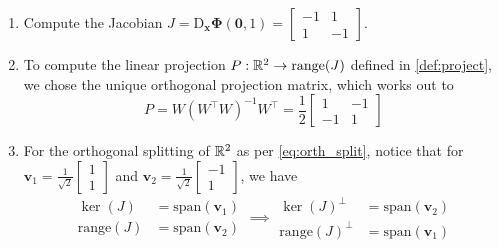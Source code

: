 \documentclass[letterpaper, 10 pt, conference, dvipsnames]{ieeeconf}
\begin{document}
\begin{enumerate}
    \itemsep 0.5em
    \item Compute the Jacobian \(J = \mathrm{D}_\mathbf{x}\boldsymbol{\Phi}(\mathbf{0},1) = \begin{bmatrix}-1&1\\1&-1\end{bmatrix}\).
    \item To compute the linear projection \(P:\R[2]\to\mathrm{range}(J)\) defined in \eqref{def:project}, {we chose the unique orthogonal projection matrix}, which works out to
          \begin{equation*}
              P = {W(W^\top W)^{-1}W^\top} = \frac12\begin{bmatrix}1&-1\\-1&1\end{bmatrix}\label{eq:P}
          \end{equation*}
    \item For the orthogonal splitting of \(\R[2]\) as per \eqref{eq:orth_split}, notice that for \(\mathbf{v}_1 = \displaystyle\frac{1}{\sqrt2}\begin{bmatrix}1\\1\end{bmatrix}\) and \(\mathbf{v}_2 = \displaystyle\frac{1}{\sqrt2}\begin{bmatrix}-1\\1\end{bmatrix}\), we have \label{eq:basis}
          \[\begin{aligned}
                  \ker(J)           & = \mathrm{span}(\mathbf{v}_1) \\
                  \mathrm{range}(J) & = \mathrm{span}(\mathbf{v}_2)
              \end{aligned}\implies\begin{aligned}
                  \ker(J)^\perp           & = \mathrm{span}(\mathbf{v}_2) \\
                  \mathrm{range}(J)^\perp & = \mathrm{span}(\mathbf{v}_1)
              \end{aligned}\]


\end{enumerate}
\end{document}
